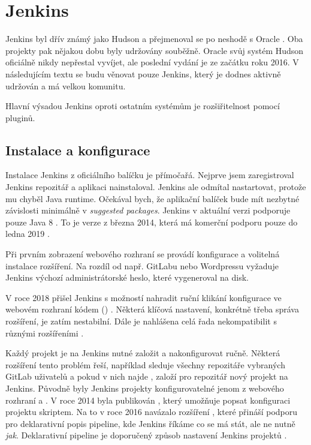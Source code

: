\section{Jenkins}
\label{sec:jenkins}
    Jenkins byl dřív známý jako Hudson a přejmenoval se po neshodě s Oracle \cite{jenkins-hudson}. Oba projekty pak nějakou dobu byly udržovány souběžně. Oracle svůj systém Hudson oficiálně nikdy nepřestal vyvíjet, ale poslední vydání je ze začátku roku 2016. V následujícím textu se budu věnovat pouze Jenkins, který je dodnes aktivně udržován a má velkou komunitu.

    Hlavní výsadou Jenkins oproti ostatním \CICD systémům je rozšiřitelnost pomocí pluginů.

    \blind[1]

    \subsection{Instalace a konfigurace}
        Instalace Jenkins z oficiálního balíčku je přímočařá. Nejprve jsem zaregistroval Jenkins  repozitář  a aplikaci nainstaloval. Jenkins ale odmítal nastartovat, protože mu chyběl Java runtime. Očekával bych, že aplikační balíček bude mít nezbytné závislosti minimálně v \textit{suggested packages}. Jenkins v aktuální verzi podporuje pouze Java 8 \cite{jenkins-java}. To je  verze z března 2014, která má komerční podporu pouze do ledna 2019 \cite{oracle-eol}.

        Při prvním zobrazení webového rozhraní se provádí konfigurace a volitelná instalace rozšíření. Na rozdíl od např. GitLabu nebo Wordpressu vyžaduje Jenkins výchozí administrátorské heslo, které vygeneroval na disk.

        V roce 2018 přišel Jenkins s možností nahradit ruční klikání konfigurace ve webovém rozhraní kódem () \cite{jenkins-casc}. Některá klíčová nastavení, konkrétně třeba správa rozšíření, je zatím nestabilní. Dále je nahlášena celá řada nekompatibilit s různými rozšířeními .

        Každý projekt je na Jenkins nutné založit a nakonfigurovat ručně. Některá rozšíření tento problém řeší, například  \cite{jenkins-plugins-gbs} sleduje všechny repozitáře vybraných GitLab uživatelů a pokud v nich najde , založí pro repozitář nový projekt na Jenkins. Původně byly Jenkins projekty konfigurovatelné jenom z webového rozhraní a . V roce 2014 byla publikován , který umožňuje popsat konfiguraci projektu skriptem. Na to v roce 2016 navázalo rozšíření , které přináší podporu pro deklarativní popis pipeline, kde Jenkins říkáme co se má stát, ale ne nutně \textit{jak}. Deklarativní pipeline je doporučený způsob nastavení Jenkins projektů \cite{jenkins-best-practices}.

